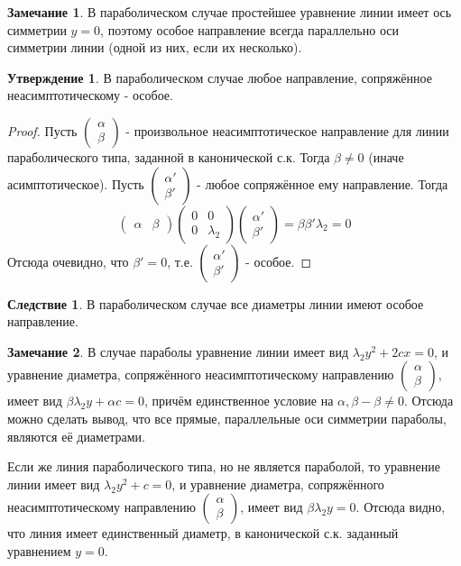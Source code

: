 \documentclass[a4paper, 12pt]{article}
\theoremstyle{definition}
\newtheorem*{consequense}{Следствие}
\newtheorem*{subtheorem}{Утверждение}
\newtheorem*{remark}{Замечание}
\begin{document}
	\begin{remark}
		В параболическом случае простейшее уравнение линии имеет ось симметрии $y = 0$, поэтому особое направление всегда параллельно оси симметрии линии (одной из них, если их несколько).
	\end{remark}
	\begin{subtheorem}
		В параболическом случае любое направление, сопряжённое\\неасимптотическому - особое.
	\end{subtheorem}
	\begin{proof}
		Пусть $\begin{pmatrix} \alpha \\ \beta \end{pmatrix}$ - произвольное неасимптотическое направление для линии параболического типа, заданной в канонической с.к. Тогда $\beta \neq 0$ (иначе асимптотическое). Пусть $\begin{pmatrix} \alpha' \\ \beta' \end{pmatrix}$ - любое сопряжённое ему направление. Тогда $$\begin{pmatrix} \alpha & \beta  \end{pmatrix}\begin{pmatrix} 0&0 \\ 0&\lambda_2 \end{pmatrix}\begin{pmatrix} \alpha' \\ \beta' \end{pmatrix} = \beta\beta'\lambda_2 = 0$$
	Отсюда очевидно, что $\beta' = 0$, т.е. $\begin{pmatrix} \alpha' \\ \beta' \end{pmatrix}$ - особое.
	\end{proof}
	\begin{consequense}
		В параболическом случае все диаметры линии имеют особое направление.
	\end{consequense}
	\begin{remark}
		В случае параболы уравнение линии имеет вид $\lambda_2y^2+2cx = 0$, и уравнение диаметра, сопряжённого неасимптотическому направлению $\begin{pmatrix} \alpha \\ \beta \end{pmatrix}$, имеет вид $\beta\lambda_2y + \alpha c = 0$, причём единственное условие на $\alpha, \beta - \beta \neq 0$. Отсюда можно сделать вывод, что все прямые, параллельные оси симметрии параболы, являются её диаметрами.

		Если же линия параболического типа, но не является параболой, то уравнение линии имеет вид $\lambda_2y^2+ c = 0$, и уравнение диаметра, сопряжённого неасимптотическому направлению $\begin{pmatrix} \alpha \\ \beta \end{pmatrix}$, имеет вид $\beta\lambda_2y = 0$. Отсюда видно, что линия имеет единственный диаметр, в канонической с.к. заданный уравнением $y = 0$.
	\end{remark}
\end{document}
